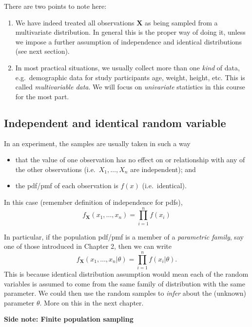 \documentclass[
]{book}
\providecommand{\tightlist}{%
  \setlength{\itemsep}{0pt}\setlength{\parskip}{0pt}}
\newcommand{\bX}{{\boldsymbol X}}
\theoremstyle{definition}
\theoremstyle{definition}
\theoremstyle{definition}
\theoremstyle{definition}
\theoremstyle{remark}
\begin{document}
There are two points to note here:

\begin{enumerate}
\def\labelenumi{\arabic{enumi}.}
\item
  We have indeed treated all observations \(\bX\) as being sampled from a multivariate distribution. In general this is the proper way of doing it, unless we impose a further assumption of independence and identical distributions (see next section).
\item
  In most practical situations, we usually collect more than one \emph{kind} of data, e.g.~demographic data for study participants age, weight, height, etc. This is called \emph{multivariable data}. We will focus on \emph{univariate} statistics in this course for the most part.
\end{enumerate}

\hypertarget{independent-and-identical-random-variable}{%
\subsection{Independent and identical random variable}\label{independent-and-identical-random-variable}}

In an experiment, the samples are usually taken in such a way

\begin{itemize}
\tightlist
\item
  that the value of one observation has no effect on or relationship with any of the other observations (i.e.~\(X_1,\dots,X_n\) are independent); and
\item
  the pdf/pmf of each observation is \(f(x)\) (i.e.~identical).
\end{itemize}

In this case (remember definition of independence for pdfs),\\
\[
f_{\bX}(x_1,\dots,x_n) = \prod_{i=1}^n f(x_i)
\]

In particular, if the population pdf/pmf is a member of a \emph{parametric family}, say one of those introduced in Chapter 2, then we can write
\[
f_{\bX}(x_1,\dots,x_n|\theta) = \prod_{i=1}^n f(x_i|\theta).
\]
This is because identical distribution assumption would mean each of the random variables is assumed to come from the same family of distribution with the same parameter.
We could then use the random samples to \emph{infer} about the (unknown) parameter \(\theta\). More on this in the next chapter.

\textbf{Side note: Finite population sampling}
\end{document}
